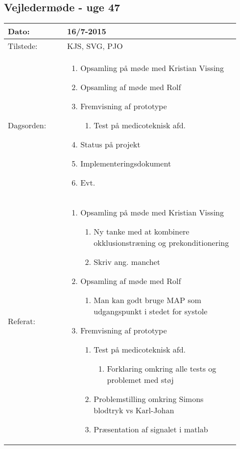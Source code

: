 	\subsection{Vejledermøde - uge 47}
	\begin{longtable}{|p{0.24\linewidth}|p{0.7\linewidth}|}
		\hline
		Dato: & 16/7-2015\\ \hline
		Tilstede: & KJS, SVG, PJO\\ \hline
		Dagsorden: &
		\begin{enumerate}
			\item Opsamling på møde med Kristian Vissing
			\item Opsamling af møde med Rolf
			\item Fremvisning af prototype
			\begin{enumerate}
				\item Test på medicoteknisk afd.
			\end{enumerate} 
			\item Status på projekt
			\item Implementeringsdokument
			\item Evt. 
		\end{enumerate}
		\\ \hline
		Referat: & 
		\begin{enumerate}
			\item Opsamling på møde med Kristian Vissing
			\begin{enumerate}
				\item Ny tanke med at kombinere okklusionstræning og prekonditionering 
				\item Skriv ang. manchet
			\end{enumerate}
			\item Opsamling af møde med Rolf
			\begin{enumerate}
				\item Man kan godt bruge MAP som udgangspunkt i stedet for systole
			\end{enumerate}
			\item Fremvisning af prototype
			\begin{enumerate}
				\item Test på medicoteknisk afd. 
				\begin{enumerate}
					\item Forklaring omkring alle tests og problemet med støj
				\end{enumerate}
				\item Problemstilling omkring Simons blodtryk vs Karl-Johan 
				\item Præsentation af signalet i matlab

\end{enumerate}
\end{enumerate}
\end{longtable}
